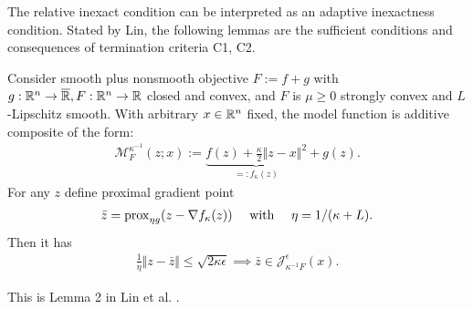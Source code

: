 \documentclass[12pt]{article}
\begin{document}
        The relative inexact condition can be interpreted as an adaptive inexactness condition. 
        Stated by Lin, the following lemmas are the sufficient conditions and consequences of termination criteria C1, C2. 
        \begin{lemma}\label{lemma:sufficient-c1}
            Consider smooth plus nonsmooth objective $F := f + g$ with $g:\mathbb R^n \rightarrow \overline {\mathbb R}, F:\mathbb R^n \rightarrow \mathbb R$ closed and convex, and $F$ is $\mu\ge 0$ strongly convex and $L$-Lipschitz smooth. 
            With arbitrary $x \in \mathbb R^n$ fixed, the model function is additive composite of the form: 
            \begin{align*}
                \mathcal M_F^{\kappa^{-1}}(z; x) := 
                \underbrace{f(z) + \frac{\kappa}{2}\Vert z - x\Vert^2}_{=: f_\kappa (z)}
                 + g(z). 
            \end{align*}
            For any $z$ define proximal gradient point 
            \begin{align*}
                \bar z = \operatorname{prox}_{\eta g}(z - \nabla f_\kappa(z)) 
                \quad 
                \text{ with } \quad  \eta = 1/(\kappa + L). 
            \end{align*}
            Then it has 
            \begin{align*}
                \frac{1}{\eta}\Vert z - \bar z\Vert
                \le \sqrt{2\kappa \epsilon} \implies 
                \bar z \in \mathcal 
                J_{\kappa^{-1}F}^\epsilon (x). 
            \end{align*}
        \end{lemma}
        \begin{remark}
            This is Lemma 2 in Lin et al. \cite{lin_catalyst_2018}. 
        \end{remark}
\end{document}

